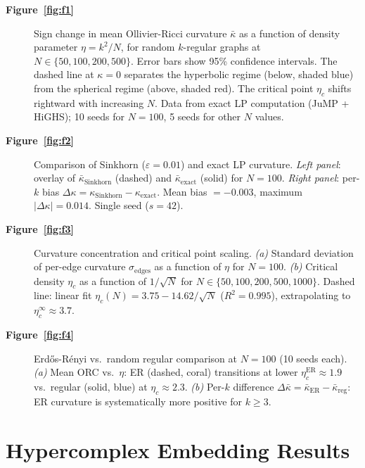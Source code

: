 \documentclass[12pt]{article}
\newcommand{\kbar}{\bar{\kappa}}
\newcommand{\etac}{\eta_c}
\begin{document}
\begin{description}
  \item[\textbf{Figure~\ref{fig:f1}}] Sign change in mean Ollivier-Ricci curvature
  $\kbar$ as a function of density parameter $\eta = k^2/N$, for random $k$-regular graphs
  at $N \in \{50, 100, 200, 500\}$. Error bars show 95\% confidence intervals. The dashed
  line at $\kappa = 0$ separates the hyperbolic regime (below, shaded blue) from the
  spherical regime (above, shaded red). The critical point $\etac$ shifts rightward with
  increasing $N$. Data from exact LP computation (JuMP + HiGHS); 10 seeds for $N = 100$,
  5 seeds for other $N$ values.

  \item[\textbf{Figure~\ref{fig:f2}}] Comparison of Sinkhorn ($\varepsilon = 0.01$) and
  exact LP curvature. \textit{Left panel}: overlay of $\kbar_{\mathrm{Sinkhorn}}$ (dashed)
  and $\kbar_{\mathrm{exact}}$ (solid) for $N = 100$. \textit{Right panel}: per-$k$ bias
  $\Delta\kappa = \kappa_{\mathrm{Sinkhorn}} - \kappa_{\mathrm{exact}}$. Mean bias $=-0.003$,
  maximum $|\Delta\kappa| = 0.014$. Single seed ($s = 42$).

  \item[\textbf{Figure~\ref{fig:f3}}] Curvature concentration and critical point scaling.
  \textit{(a)} Standard deviation of per-edge curvature $\sigma_{\mathrm{edges}}$ as a
  function of $\eta$ for $N = 100$. \textit{(b)} Critical density $\etac$ as a function of
  $1/\sqrt{N}$ for $N \in \{50, 100, 200, 500, 1000\}$. Dashed line: linear fit
  $\etac(N) = 3.75 - 14.62/\sqrt{N}$ ($R^2 = 0.995$), extrapolating to
  $\etac^\infty \approx 3.7$.

  \item[\textbf{Figure~\ref{fig:f4}}] Erd\H{o}s-R\'{e}nyi vs.\ random regular comparison
  at $N = 100$ (10 seeds each). \textit{(a)} Mean ORC vs.\ $\eta$: ER (dashed, coral)
  transitions at lower $\etac^{\mathrm{ER}} \approx 1.9$ vs.\ regular (solid, blue) at
  $\etac \approx 2.3$. \textit{(b)} Per-$k$ difference $\Delta\kbar = \kbar_{\mathrm{ER}} -
  \kbar_{\mathrm{reg}}$: ER curvature is systematically more positive for $k \geq 3$.

\end{description}

\section{Hypercomplex Embedding Results}
\label{app:E}
\end{document}
